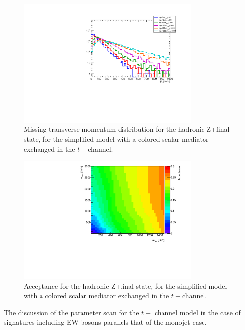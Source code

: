 \begin{figure}[h!]
	\centering  
	\includegraphics[width=0.8\textwidth]{figures/EW/monoZhad_TChannel/metPt}
	\caption{Missing transverse momentum distribution for the hadronic Z+\MET final state,
		for the simplified model with a colored scalar mediator exchanged in the $t-$channel.}
	\label{fig:TChan_EW_Zhad_MET}
\end{figure}

\begin{figure}[h!]
	\centering  
	\includegraphics[width=0.8\textwidth]{figures/EW/monoZhad_TChannel/TChan_newplot.pdf}
	\caption{Acceptance for the hadronic Z+\MET final state,
		for the simplified model with a colored scalar mediator exchanged in the $t-$channel.}
	\label{fig:TChan_EW_Zhad_acc}
\end{figure}

The discussion of the parameter scan for the $t-$ channel model
in the case of signatures including EW bosons
parallels that of the monojet case. 


